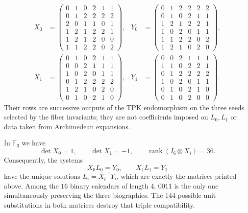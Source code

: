 \begin{equation}
\begin{aligned}
X_0&=\begin{pmatrix}
0&1&0&2&1&1\\0&1&2&2&2&2\\2&0&1&1&0&1\\
1&2&1&2&2&1\\1&2&1&2&0&0\\1&1&2&2&0&2
\end{pmatrix},&
Y_0&=\begin{pmatrix}
0&1&2&2&2&2\\0&1&0&2&1&1\\1&2&1&2&2&1\\
1&0&2&0&1&1\\1&1&2&2&0&2\\1&2&1&0&2&0
\end{pmatrix},\\[1ex]
X_1&=\begin{pmatrix}
0&1&0&2&1&1\\0&0&2&1&1&1\\1&0&2&0&1&1\\
0&1&2&2&2&2\\1&2&1&0&2&0\\0&1&0&2&1&0
\end{pmatrix},&
Y_1&=\begin{pmatrix}
0&0&2&1&1&1\\1&1&0&2&2&1\\0&1&2&2&2&2\\
1&0&2&0&1&1\\0&1&0&2&1&0\\0&1&0&2&0&0
\end{pmatrix}.
\end{aligned}
\label{eq:registro-transiciones-tpk-explicito-rev10}
\end{equation}
\endgroup
Their rows are successive outputs of the TPK endomorphism on the three seeds
selected by the fiber invariants; they are not coefficients imposed on
\(L_0,L_1\) or data taken from Archimedean expansions.

\begin{theorem}
\label{thm:reconstruccion-lifts-calendario-rev10}
In \(\mathbb F_3\) we have
\[
 \det X_0=1,
 \qquad \det X_1=-1,
 \qquad \operatorname{rank}(I_6\otimes X_i)=36.
\]
Consequently, the systems
\[
 X_0L_0=Y_0,
 \qquad X_1L_1=Y_1
\]
have the unique solutions \(L_i=X_i^{-1}Y_i\), which are exactly the
matrices printed above. Among the \(16\) binary calendars of length
\(4\), \(0011\) is the only one simultaneously preserving the three
biographies. The \(144\) possible unit substitutions in both matrices
destroy that triple compatibility.
\end{theorem}

